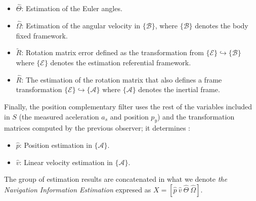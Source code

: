 \documentclass[conference]{IEEEtran}
\newcommand{\marco}[1]{\{\mathcal{#1}\}}
\begin{document}
\begin{itemize}
\item $\hat{\Theta}$: Estimation of the Euler angles.
\item $\hat{\Omega}$: Estimation of  the angular velocity in $\marco{B}$, where $\marco{B}$ denotes the body fixed framework.
\item $\tilde{R}$: Rotation matrix error defined as the transformation from $\marco{E}\hookrightarrow\marco{B}$ where $\marco{E}$ denotes the estimation referential framework.
\item $\hat{R}$: The estimation of the rotation matrix that also defines a frame transformation $ \marco{E}\hookrightarrow\marco{A}$ where $\marco{A}$ denotes the inertial frame.
\end{itemize}
Finally, the position complementary filter uses the rest of the variables included in $S$ (the measured aceleration $a_s$ and position $p_y$) and the transformation matrices computed by the previous observer; it determines :
\begin{itemize}
\item $\hat{p}$: Position estimation in $\marco{A}$.
\item $\hat{v}$: Linear velocity estimation in $\marco{A}$.
\end{itemize}
The group of estimation results are concatenated in what we denote \emph{the Navigation Information Estimation } expresed as $X=[\hat{p}~\hat{v}~\hat{\Theta}~\hat{\Omega}]$.\par
\end{document}

